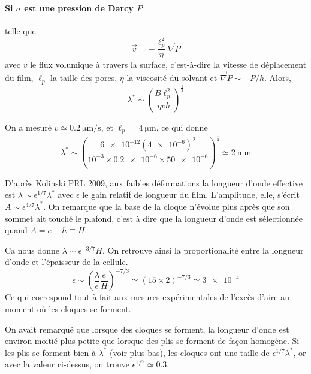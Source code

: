 \documentclass[12pt,a4paper]{article}
\begin{document}
\paragraph*{Si $\sigma$ est une pression de Darcy $P$} telle que 
\begin{equation}
\vec{v} = - \frac{\ell_p^2}{\eta}  \vec{\nabla} P
\label{eq:Darcy}
\end{equation}
avec $v$ le flux volumique à travers la surface, c'est-à-dire la vitesse de déplacement du film, $\ell_p$ la taille des pores, $\eta$ la viscosité du solvant et $\vec{\nabla} P \sim -P/h$. Alors,
\begin{equation}
\lambda^* \sim \left(\frac{B \ell_p^2}{\eta v h}\right)^\frac{1}{3}
\end{equation}

On a mesuré $v\simeq \SI{0.2}{\micro\metre\per\second}$, et $\ell_p=\SI{4}{\micro\metre}$, ce qui donne 
\begin{equation}
\lambda^* \sim \left(\frac{\num{6e-12} (\num{4e-6})^2}{10^{-3} \times \num{0.2e-6} \times \num{50e-6}}\right)^\frac{1}{3} \simeq \SI{2}{\milli\metre}
\end{equation}

D'après Kolinski PRL 2009, aux faibles déformations la longueur d'onde effective est $\lambda \sim \epsilon^{1/7} \lambda^*$ avec $\epsilon$ le gain relatif de longueur du film. L'amplitude, elle, s'écrit $A \sim \epsilon^{4/7} \lambda^*$. On remarque que la base de la cloque n'évolue plus après que son sommet ait touché le plafond, c'est à dire que la longueur d'onde est sélectionnée quand $A=e-h\equiv H$.

Ca nous donne $\lambda \sim \epsilon^{-3/7} H$. On retrouve ainsi la proportionalité entre la longueur d'onde et l'épaisseur de la cellule.
\begin{equation}
\epsilon \sim \left(\frac{\lambda}{e}\frac{e}{H}\right)^{-7/3} \simeq \left(15\times 2\right)^{-7/3} \simeq \num{3e-4}
\end{equation}
Ce qui correspond tout à fait aux mesures expérimentales de l'excès d'aire au moment où les cloques se forment.

On avait remarqué que lorsque des cloques se forment, la longueur d'onde est environ moitié plus petite que lorsque des plis se forment de façon homogène. Si les plis se forment bien à $\lambda^*$ (voir plus bas), les cloques ont une taille de $\epsilon^{1/7} \lambda^*$, or avec la valeur ci-dessus, on trouve $\epsilon^{1/7}\simeq 0.3$.

\pagebreak
\end{document}
